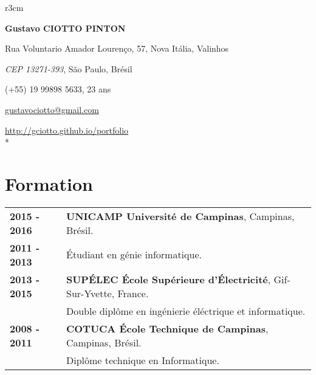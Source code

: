 \documentclass[10pt, a4paper]{article}
\author{Gustavo Ciotto Pinton}
\begin{document}
\pagestyle{empty} 

\begin{wrapfigure}{r}{3cm}
  \vspace{-20pt}
  \begin{center}
  \end{center}
\end{wrapfigure}

\textbf{\LARGE Gustavo CIOTTO PINTON}

Rua Voluntario Amador Lourenço, 57, Nova Itália, Valinhos

\textit{CEP 13271-393}, São Paulo, Brésil

(+55) 19 99898 5633, 23 ans

\url{gustavociotto@gmail.com} 

\url{http://gciotto.github.io/portfolio}\\*



\section{Formation}

\begin{tabular}{p{} p{}}

 \textbf{2015 - 2016} & \textbf{UNICAMP Université de Campinas}, Campinas,
 Brésil.
 \\
 \textbf{2011 - 2013} & Étudiant en génie informatique. \vspace{8pt}\\

 \textbf{2013 - 2015} & \textbf{SUPÉLEC  École Supérieure d'Électricité},
 Gif-Sur-Yvette, France. \\
 & Double diplôme en ingénierie éléctrique et informatique. \vspace{8pt}
 \\
  
 
 \textbf{2008 - 2011} & \textbf{COTUCA École Technique de Campinas}, Campinas, Brésil. \\ 
 & Diplôme technique en Informatique. \\
\end{tabular}
\end{document}
